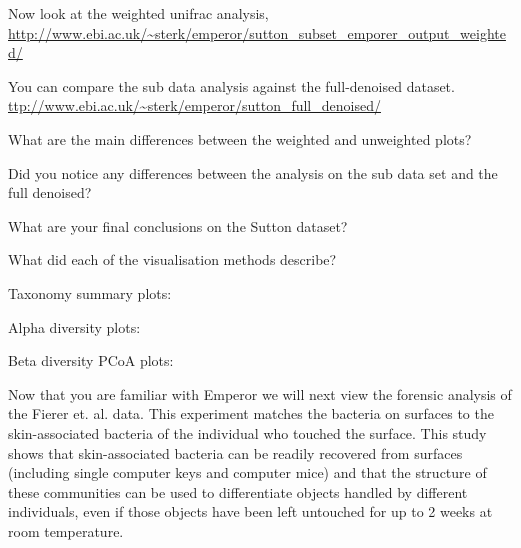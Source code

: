 \begin{steps}
Now look at the weighted unifrac analysis, \url{http://www.ebi.ac.uk/~sterk/emperor/sutton_subset_emporer_output_weighted/}

You can compare the sub data analysis against the full-denoised dataset.
\url{ttp://www.ebi.ac.uk/~sterk/emperor/sutton_full_denoised/}
\end{steps}

\begin{questions}
What are the main differences between the weighted and unweighted plots?
\begin{answer}

\end{answer}
\end{questions}

\begin{questions}
Did you notice any differences between the analysis on the sub data set and the full denoised?
\begin{answer}

\end{answer}
\end{questions}

\begin{questions}
What are your final conclusions on the Sutton dataset? 
\begin{answer}

\end{answer}
\end{questions}

\begin{questions}
What did each of the visualisation methods describe?
\begin{answer}
Taxonomy summary plots: 

Alpha diversity plots:

Beta diversity PCoA plots:

\end{answer}
\end{questions}
	
Now that you are familiar with Emperor we will next view the forensic analysis of the Fierer et. al. data. This experiment matches the bacteria on surfaces to the skin-associated bacteria of the individual who touched the surface. 
This study shows that skin-associated bacteria can be readily recovered from surfaces (including single computer keys and computer mice) and that the structure of these communities can be used to differentiate objects handled by different individuals, even if those objects have been left untouched for up to 2 weeks at room temperature.

